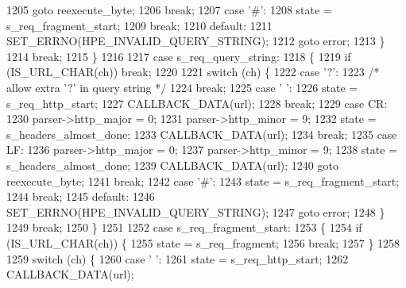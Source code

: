 \begin{DoxyCode}
1205             \textcolor{keywordflow}{goto} reexecute\_byte;
1206             \textcolor{keywordflow}{break};
1207           \textcolor{keywordflow}{case} \textcolor{charliteral}{'#'}:
1208             state = s_req_fragment_start;
1209             \textcolor{keywordflow}{break};
1210           \textcolor{keywordflow}{default}:
1211             SET_ERRNO(HPE_INVALID_QUERY_STRING);
1212             \textcolor{keywordflow}{goto} error;
1213         \}
1214         \textcolor{keywordflow}{break};
1215       \}
1216 
1217       \textcolor{keywordflow}{case} s_req_query_string:
1218       \{
1219         \textcolor{keywordflow}{if} (IS_URL_CHAR(ch)) \textcolor{keywordflow}{break};
1220 
1221         \textcolor{keywordflow}{switch} (ch) \{
1222           \textcolor{keywordflow}{case} \textcolor{charliteral}{'?'}:
1223             \textcolor{comment}{/* allow extra '?' in query string */}
1224             \textcolor{keywordflow}{break};
1225           \textcolor{keywordflow}{case} \textcolor{charliteral}{' '}:
1226             state = s_req_http_start;
1227             CALLBACK_DATA(url);
1228             \textcolor{keywordflow}{break};
1229           \textcolor{keywordflow}{case} CR:
1230             parser->http_major = 0;
1231             parser->http_minor = 9;
1232             state = s_headers_almost_done;
1233             CALLBACK_DATA(url);
1234             \textcolor{keywordflow}{break};
1235           \textcolor{keywordflow}{case} LF:
1236             parser->http_major = 0;
1237             parser->http_minor = 9;
1238             state = s_headers_almost_done;
1239             CALLBACK_DATA(url);
1240             \textcolor{keywordflow}{goto} reexecute\_byte;
1241             \textcolor{keywordflow}{break};
1242           \textcolor{keywordflow}{case} \textcolor{charliteral}{'#'}:
1243             state = s_req_fragment_start;
1244             \textcolor{keywordflow}{break};
1245           \textcolor{keywordflow}{default}:
1246             SET_ERRNO(HPE_INVALID_QUERY_STRING);
1247             \textcolor{keywordflow}{goto} error;
1248         \}
1249         \textcolor{keywordflow}{break};
1250       \}
1251 
1252       \textcolor{keywordflow}{case} s_req_fragment_start:
1253       \{
1254         \textcolor{keywordflow}{if} (IS_URL_CHAR(ch)) \{
1255           state = s_req_fragment;
1256           \textcolor{keywordflow}{break};
1257         \}
1258 
1259         \textcolor{keywordflow}{switch} (ch) \{
1260           \textcolor{keywordflow}{case} \textcolor{charliteral}{' '}:
1261             state = s_req_http_start;
1262             CALLBACK_DATA(url);

\end{DoxyCode}
